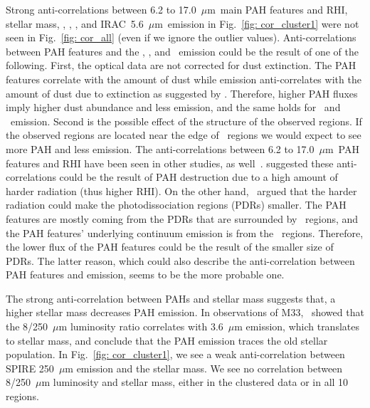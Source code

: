      
        Strong anti-correlations between 6.2 to 17.0~$\mu$m~main PAH features and RHI, stellar mass, \halphadot, \sii, \oiii, and IRAC~5.6~$\mu$m~emission in Fig.~\ref{fig: cor_cluster1} were not seen in Fig.~\ref{fig: cor_all} (even if we ignore the outlier values).
        Anti-correlations between PAH features and the \halphadot, \sii, and \oiii~emission could be the result of one of the following. 
        First, the optical data are not corrected for dust extinction.
        The PAH features correlate with the amount of dust while \halpha emission anti-correlates with the amount of dust due to extinction as suggested by \cite{Calzetti94}.
        Therefore, higher PAH fluxes imply higher dust abundance and less \halpha emission, and the same holds for \sii~and \oiii~emission.
        Second is the possible effect of the structure of the observed regions.
        If the observed regions are located near the edge of \hii~regions we would expect to see more PAH and less \halpha emission. 
        The anti-correlations between 6.2 to 17.0~$\mu$m~PAH features and RHI have been seen in other studies, as well~\citep[e.g.][]{Wu06, Gordon08,Calzetti10,Dim15}. 
        \cite{Wu06} suggested these anti-correlations could be the result of PAH destruction due to a high amount of harder radiation (thus higher RHI).
        On the other hand,~\cite{Gordon08} argued that the harder radiation could make the photodissociation regions (PDRs) smaller.
        The PAH features are mostly coming from the PDRs that are surrounded by \hii~regions, and the PAH features' underlying continuum emission is from the \hii~regions.
        Therefore, the lower flux of the PAH features could be the result of the smaller size of PDRs.%
        The latter reason, which could also describe the anti-correlation between PAH features and \halpha emission, seems to be the more probable one. 
        
        The strong anti-correlation between PAHs and stellar mass suggests that, a higher stellar mass decreases PAH emission. 
        In observations of M33,~\cite{Calapa14} showed that the 8/250~$\mu$m luminosity ratio correlates with 3.6~$\mu$m emission, which translates to stellar mass, %
        and conclude that the PAH emission traces the old stellar population.
        In Fig.~\ref{fig: cor_cluster1}, we see a weak anti-correlation between SPIRE 250~$\mu$m emission and the stellar mass.
        We see no correlation between 8/250~$\mu$m luminosity and stellar mass, either in the clustered data or in all 10 regions.

